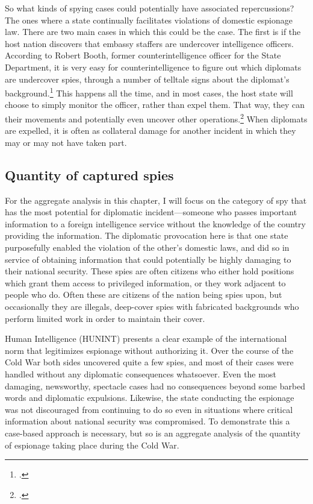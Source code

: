 \documentclass{memoir}
\begin{document}
\begin{refsegment}
So what kinds of spying cases could potentially have associated repercussions? The ones where a state continually facilitates violations of domestic espionage law. There are two main cases in which this could be the case. The first is if the host nation discovers that embassy staffers are undercover intelligence officers. According to Robert Booth, former counterintelligence officer for the State Department, it is very easy for counterintelligence to figure out which diplomats are undercover spies, through a number of telltale signs about the diplomat's background.\footcite{booth_personal_2019} This happens all the time, and in most cases, the host state will choose to simply monitor the officer, rather than expel them. That way, they can their movements and potentially even uncover other operations.\footcite{booth_personal_2019} When diplomats are expelled, it is often as collateral damage for another incident in which they may or may not have taken part.

\subsection{Quantity of captured spies}
For the aggregate analysis in this chapter, I will focus on the category of spy that has the most potential for diplomatic incident---someone who passes important information to a foreign intelligence service without the knowledge of the country providing the information. The diplomatic provocation here is that one state purposefully enabled the violation of the other's domestic laws, and did so in service of obtaining information that could potentially be highly damaging to their national security. These spies are often citizens who either hold positions which grant them access to privileged information, or they work adjacent to people who do. Often these are citizens of the nation being spies upon, but occasionally they are illegals, deep-cover spies with fabricated backgrounds who perform limited work in order to maintain their cover.

Human Intelligence (HUNINT) presents a clear example of the international norm that legitimizes espionage without authorizing it. Over the course of the Cold War both sides uncovered quite a few spies, and most of their cases were handled without any diplomatic consequences whatsoever. Even the most damaging, newsworthy, spectacle cases had no consequences beyond some barbed words and diplomatic expulsions. Likewise, the state conducting the espionage was not discouraged from continuing to do so even in situations where critical information about national security was compromised. To demonstrate this a case-based approach is necessary, but so is an aggregate analysis of the quantity of espionage taking place during the Cold War.


\end{refsegment}
\end{document}
